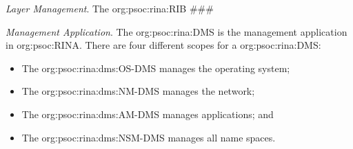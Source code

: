 \textit{Layer Management}.
The \ac{org:psoc:rina:RIB} \#\#\#

\textit{Management Application}.
The \ac{org:psoc:rina:DMS} is the management application in \acs{org:psoc:RINA}.
There are four different scopes for a \ac{org:psoc:rina:DMS}:
    \begin{itemize}[topsep=0pt, partopsep=0pt, nosep]
        \item The \ac{org:psoc:rina:dms:OS-DMS} manages the operating system;
        \item The \ac{org:psoc:rina:dms:NM-DMS} manages the network;
        \item The \ac{org:psoc:rina:dms:AM-DMS} manages applications; and
        \item The \ac{org:psoc:rina:dms:NSM-DMS} manages all name spaces.
    \end{itemize}
